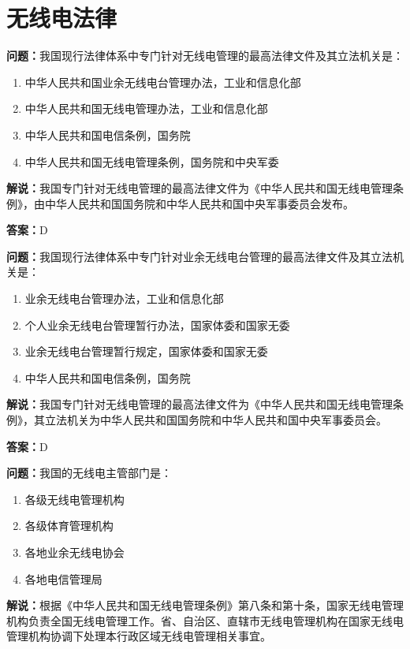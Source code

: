 \chapter{无线电法律}

\textbf{问题：}我国现行法律体系中专门针对无线电管理的最高法律文件及其立法机关是：

\begin{enumerate}[label=\Alph*), leftmargin=3em]
	\item 中华人民共和国业余无线电台管理办法，工业和信息化部
	\item 中华人民共和国无线电管理办法，工业和信息化部
	\item 中华人民共和国电信条例，国务院
	\item 中华人民共和国无线电管理条例，国务院和中央军委
\end{enumerate}

\textbf{解说：}我国专门针对无线电管理的最高法律文件为《中华人民共和国无线电管理条例》，由中华人民共和国国务院和中华人民共和国中央军事委员会发布。

\textbf{答案：}D

\textbf{问题：}我国现行法律体系中专门针对业余无线电台管理的最高法律文件及其立法机关是：

\begin{enumerate}[label=\Alph*), leftmargin=3em]
	\item 业余无线电台管理办法，工业和信息化部
	\item 个人业余无线电台管理暂行办法，国家体委和国家无委
	\item 业余无线电台管理暂行规定，国家体委和国家无委
	\item 中华人民共和国电信条例，国务院
\end{enumerate}

\textbf{解说：}我国专门针对无线电管理的最高法律文件为《中华人民共和国无线电管理条例》，其立法机关为中华人民共和国国务院和中华人民共和国中央军事委员会。

\textbf{答案：}D

\textbf{问题：}我国的无线电主管部门是：

\begin{enumerate}[label=\Alph*), leftmargin=3em]
	\item 各级无线电管理机构
	\item 各级体育管理机构
	\item 各地业余无线电协会
	\item 各地电信管理局
\end{enumerate}

\textbf{解说：}根据《中华人民共和国无线电管理条例》第八条和第十条，国家无线电管理机构负责全国无线电管理工作。省、自治区、直辖市无线电管理机构在国家无线电管理机构协调下处理本行政区域无线电管理相关事宜。

